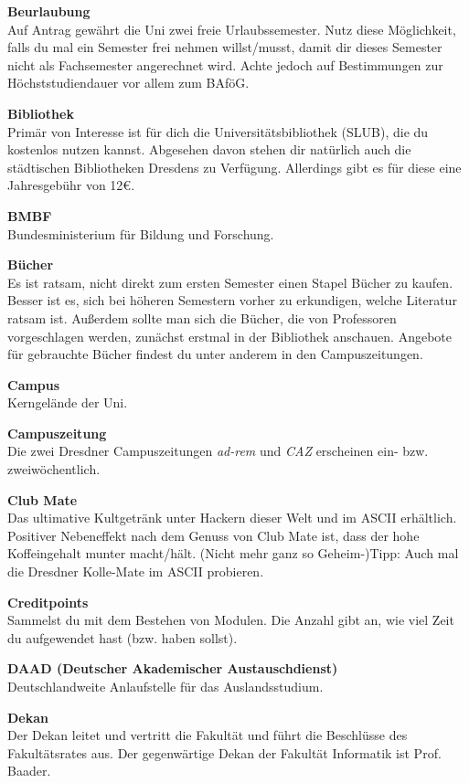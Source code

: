 \textbf{Beurlaubung} \\
Auf Antrag gewährt die Uni zwei freie Urlaubssemester.
Nutz diese Möglichkeit, falls du mal ein Semester frei nehmen willst/musst, damit dir dieses Semester nicht als Fachsemester angerechnet wird.
Achte jedoch auf Bestimmungen zur Höchststudiendauer vor allem zum BAföG.

\textbf{Bibliothek} \\
Primär von Interesse ist für dich die Universitätsbibliothek (SLUB), die du kostenlos nutzen kannst.
Abgesehen davon stehen dir natürlich auch die städtischen Bibliotheken Dresdens zu Verfügung.
Allerdings gibt es für diese eine Jahresgebühr von 12\euro.

\textbf{BMBF} \\
Bundesministerium für Bildung und Forschung.

\textbf{Bücher} \\
Es ist ratsam, nicht direkt zum ersten Semester einen Stapel Bücher zu kaufen.
Besser ist es, sich bei höheren Semestern vorher zu erkundigen, welche Literatur ratsam ist.
Außerdem sollte man sich die Bücher, die von Professoren vorgeschlagen werden, zunächst erstmal in der Bibliothek anschauen.
Angebote für gebrauchte Bücher findest du unter anderem in den Campuszeitungen.

\textbf{Campus} \\
Kerngelände der Uni.

\textbf{Campuszeitung} \\
Die zwei Dresdner Campuszeitungen \textit{ad-rem} und \textit{CAZ} erscheinen ein- bzw. zweiwöchentlich.

\textbf{Club Mate} \\
Das ultimative Kultgetränk unter Hackern dieser Welt und im ASCII erhältlich.
Positiver Nebeneffekt nach dem Genuss von Club Mate ist, dass der hohe Koffeingehalt munter macht/hält.
(Nicht mehr ganz so Geheim-)Tipp:
Auch mal die Dresdner Kolle-Mate im ASCII probieren.

\textbf{Creditpoints} \\
Sammelst du mit dem Bestehen von Modulen.
Die Anzahl gibt an, wie viel Zeit du aufgewendet hast (bzw. haben sollst).

\textbf{DAAD (Deutscher Akademischer Austauschdienst)} \\
Deutschlandweite Anlaufstelle für das Auslandsstudium.

\textbf{Dekan} \\
Der Dekan leitet und vertritt die Fakultät und führt die Beschlüsse des Fakultätsrates aus.
Der gegenwärtige Dekan der Fakultät Informatik ist Prof. Baader.

